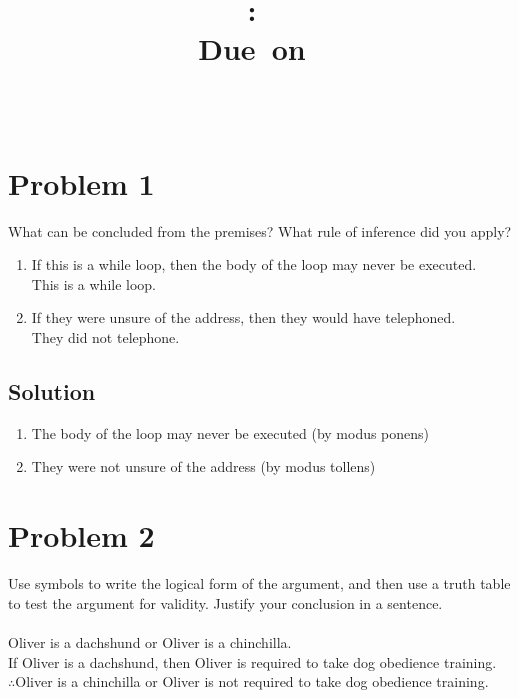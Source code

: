 \documentclass[table]{article}
\title{
    \vspace{2in}
    \textmd{\textbf{\hmwkClass:\ \hmwkTitle}}\\
    \normalsize\vspace{0.1in}\small{Due\ on\ \hmwkDueDate}\\
    \vspace{0.1in}\large{\textit{\hmwkClassInstructor\ \hmwkClassTime}}
    \vspace{3in}
}
\author{\hmwkAuthorName}
\date{}
\begin{document}
\maketitle
\pagebreak
\section{Problem 1}
What can be concluded from the premises? What rule of inference did you apply?
\begin{enumerate}[nosep, label=\alph*)]
\item If this is a while loop, then the body of the loop may never be executed.\\This is a while loop.
\item If they were unsure of the address, then they would have telephoned.\\They did not telephone.
\end{enumerate}
\subsection{Solution}
\begin{enumerate}[nosep,label=\alph*)]
\item The body of the loop may never be executed (by modus ponens)
\item They were not unsure of the address (by modus tollens)
\end{enumerate}
\section{Problem 2}
Use symbols to write the logical form of the argument, and then use a truth table to test the
argument for validity. Justify your conclusion in a sentence.\\~\\
Oliver is a dachshund or Oliver is a chinchilla.\\
If Oliver is a dachshund, then Oliver is required to take dog obedience training.\\
$\therefore$Oliver is a chinchilla or Oliver is not required to take dog obedience training.
\end{document}

